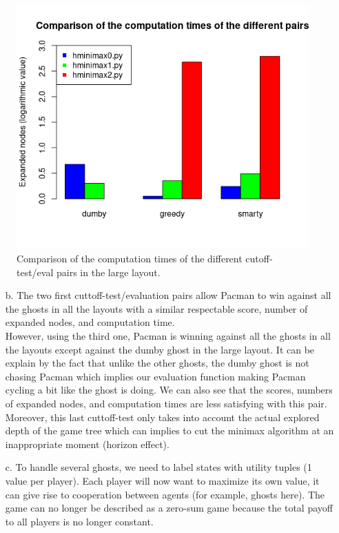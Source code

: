 \documentclass{article}
\begin{document}
		\begin{figure}[H]
			\centering
			\includegraphics[scale=0.75]{plots/3a_times.png} 
			\caption{Comparison of the computation times of the different cutoff-test/eval pairs in the large layout.}
		\end{figure}
\begin{enumerate}[label=\alph*.,leftmargin=*]	
	\item[b.] The two first cuttoff-test/evaluation pairs allow Pacman to win against all the ghosts in all the layouts with a similar respectable score, number of expanded nodes, and computation time.\\
	However, using the third one, Pacman is winning against all the ghosts in all the layouts except against the dumby ghost in the large layout. It can be explain by the fact that unlike the other ghosts, the dumby ghost is not chasing Pacman which implies our evaluation function making Pacman cycling a bit like the ghost is doing. We can also see that the scores, numbers of expanded nodes, and computation times are less satisfying with this pair.\\
	Moreover, this last cuttoff-test only takes into account the actual explored depth of the game tree which can implies to cut the minimax algorithm at an inappropriate moment (horizon effect).

    \item[c.] To handle several ghosts, we need to label states with utility tuples (1 value per player). Each player will now want to maximize its own value, it can give rise to cooperation between agents (for example, ghosts here). The game can no longer be described as a zero-sum game because the total payoff to all players is no longer constant.

\end{enumerate}

\end{document}
